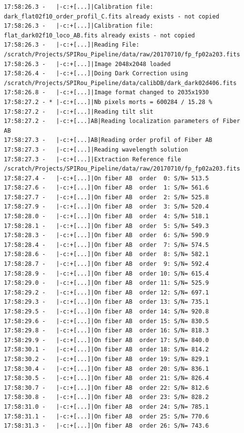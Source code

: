 \begin{lstlisting}[style=text]
17:58:26.3 -   |-c:+[...]|Calibration file: dark_flat02f10_order_profil_C.fits already exists - not copied
17:58:26.3 -   |-c:+[...]|Calibration file: flat_dark02f10_loco_AB.fits already exists - not copied
17:58:26.3 -   |-c:+[...]|Reading File: /scratch/Projects/SPIRou_Pipeline/data/raw/20170710/fp_fp02a203.fits
17:58:26.3 -   |-c:+[...]|Image 2048x2048 loaded
17:58:26.4 -   |-c:+[...]|Doing Dark Correction using /scratch/Projects/SPIRou_Pipeline/data/calibDB/dark_dark02d406.fits
17:58:26.8 -   |-c:+[...]|Image format changed to 2035x1930
17:58:27.2 - * |-c:+[...]|Nb pixels morts = 600284 / 15.28 %
17:58:27.2 -   |-c:+[...]|Reading tilt slit 
17:58:27.2 -   |-c:+[...]AB|Reading localization parameters of Fiber AB
17:58:27.3 -   |-c:+[...]AB|Reading order profil of Fiber AB
17:58:27.3 -   |-c:+[...]|Reading wavelength solution 
17:58:27.3 -   |-c:+[...]|Extraction Reference file  /scratch/Projects/SPIRou_Pipeline/data/raw/20170710/fp_fp02a203.fits
17:58:27.4 -   |-c:+[...]|On fiber AB  order  0: S/N= 513.5  
17:58:27.6 -   |-c:+[...]|On fiber AB  order  1: S/N= 561.6  
17:58:27.7 -   |-c:+[...]|On fiber AB  order  2: S/N= 525.8  
17:58:27.9 -   |-c:+[...]|On fiber AB  order  3: S/N= 520.4  
17:58:28.0 -   |-c:+[...]|On fiber AB  order  4: S/N= 518.1  
17:58:28.1 -   |-c:+[...]|On fiber AB  order  5: S/N= 549.3  
17:58:28.3 -   |-c:+[...]|On fiber AB  order  6: S/N= 590.9  
17:58:28.4 -   |-c:+[...]|On fiber AB  order  7: S/N= 574.5  
17:58:28.6 -   |-c:+[...]|On fiber AB  order  8: S/N= 582.1  
17:58:28.7 -   |-c:+[...]|On fiber AB  order  9: S/N= 592.4  
17:58:28.9 -   |-c:+[...]|On fiber AB  order 10: S/N= 615.4  
17:58:29.0 -   |-c:+[...]|On fiber AB  order 11: S/N= 525.9  
17:58:29.2 -   |-c:+[...]|On fiber AB  order 12: S/N= 697.1  
17:58:29.3 -   |-c:+[...]|On fiber AB  order 13: S/N= 735.1  
17:58:29.5 -   |-c:+[...]|On fiber AB  order 14: S/N= 920.8  
17:58:29.6 -   |-c:+[...]|On fiber AB  order 15: S/N= 830.5  
17:58:29.8 -   |-c:+[...]|On fiber AB  order 16: S/N= 818.3  
17:58:29.9 -   |-c:+[...]|On fiber AB  order 17: S/N= 840.0  
17:58:30.1 -   |-c:+[...]|On fiber AB  order 18: S/N= 814.2  
17:58:30.2 -   |-c:+[...]|On fiber AB  order 19: S/N= 829.1  
17:58:30.4 -   |-c:+[...]|On fiber AB  order 20: S/N= 836.1  
17:58:30.5 -   |-c:+[...]|On fiber AB  order 21: S/N= 826.4  
17:58:30.7 -   |-c:+[...]|On fiber AB  order 22: S/N= 812.6  
17:58:30.8 -   |-c:+[...]|On fiber AB  order 23: S/N= 828.2
17:58:31.0 -   |-c:+[...]|On fiber AB  order 24: S/N= 785.1
17:58:31.1 -   |-c:+[...]|On fiber AB  order 25: S/N= 770.6
17:58:31.3 -   |-c:+[...]|On fiber AB  order 26: S/N= 743.6

\end{lstlisting}
